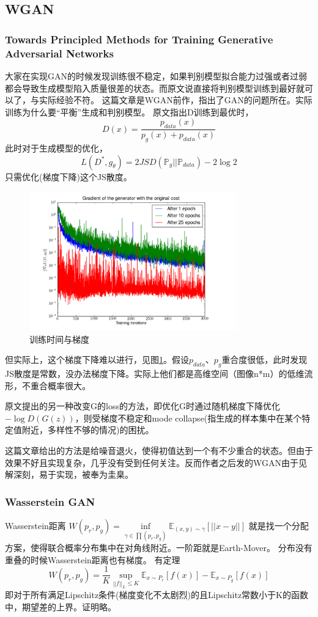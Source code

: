 \documentclass[a4paper]{article}
\begin{document}
\subsection{WGAN}
\subsubsection{Towards Principled Methods for Training Generative Adversarial Networks\cite{DBLP:journals/corr/ArjovskyB17}}
大家在实现GAN的时候发现训练很不稳定，如果判别模型拟合能力过强或者过弱都会导致生成模型陷入质量很差的状态。而原文说直接将判别模型训练到最好就可以了，与实际经验不符。
这篇文章是WGAN前作，指出了GAN的问题所在。实际训练为什么要“平衡”生成和判别模型。
原文指出D训练到最优时，$$D(x) = \frac{p_{data}(x)}{p_g(x) + p_{data}(x)}$$
此时对于生成模型的优化，$$L(D^*,g_\theta)=2JSD(\mathbb{P}_g||\mathbb{P}_{data})-2\log 2$$只需优化(梯度下降)这个JS散度。
\begin{figure}
\centering
\includegraphics[width=0.8\textwidth]{./img/4.png}
\caption{训练时间与梯度}
\label{fig:4}
\end{figure}
但实际上，这个梯度下降难以进行，见图\ref{fig:4}。假设$p_{data}、p_{g}$重合度很低，此时发现JS散度是常数，没办法梯度下降。实际上他们都是高维空间（图像n*m）的低维流形，不重合概率很大。

原文提出的另一种改变G的loss的方法，即优化G时通过随机梯度下降优化$-\log D(G(z))$，则受梯度不稳定和mode collapse(指生成的样本集中在某个特定值附近，多样性不够的情况)的困扰。

这篇文章给出的方法是给噪音退火，使得初值达到一个有不少重合的状态。但由于效果不好且实现复杂，几乎没有受到任何关注。反而作者之后发的WGAN由于见解深刻，易于实现，被奉为圭臬。

\subsubsection{Wasserstein GAN\cite{DBLP:journals/corr/ArjovskyCB17}}
Wasserstein距离
$W(p_r,p_g)=\inf\limits_{\gamma\in \prod (p_r,p_g) }\mathbb{E}_{(x,y)\sim \gamma}[||x - y||]$
就是找一个分配方案，使得联合概率分布集中在对角线附近。一阶距就是Earth-Mover。
分布没有重叠的时候Wasserstein距离也有梯度。
有定理$$W(p_r,p_g) = \frac{1}{K}\sup\limits_{||f||_L\leq K}\mathbb{E}_{x\sim P_r}[f(x)]-\mathbb{E}_{x\sim P_g}[f(x)]$$
即对于所有满足Lipschitz条件(梯度变化不太剧烈)的且Lipschitz常数小于K的函数中，期望差的上界。证明略。
\end{document}
